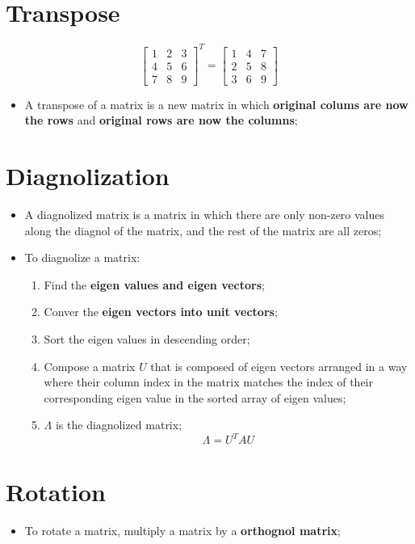 \section{Transpose}

  \begin{equation}
    \begin{bmatrix}
      1 & 2 & 3 \\
      4 & 5 & 6 \\
      7 & 8 & 9
    \end{bmatrix}^{T}
    = 
    \begin{bmatrix}
      1 & 4 & 7 \\
      2 & 5 & 8 \\
      3 & 6 & 9
    \end{bmatrix}
  \end{equation}

  \begin{itemize}
    \item A transpose of a matrix is a new matrix in which \textbf{original colums are now the rows} and \textbf{original rows are now the columns};
  \end{itemize}
  
\section{Diagnolization}

  \begin{itemize}
    \item A diagnolized matrix is a matrix in which there are only non-zero values along the diagnol of the matrix, and the rest of the matrix are all zeros;
    \item To diagnolize a matrix:
    \begin{enumerate}
      \item Find the \textbf{eigen values and eigen vectors};
      \item Conver the \textbf{eigen vectors into unit vectors};
      \item Sort the eigen values in descending order;
      \item Compose a matrix $ U $ that is composed of eigen vectors arranged in a way where their column index in the matrix matches the index of their corresponding eigen value in the sorted array of eigen values;
      \item $ \Lambda $ is the diagnolized matrix;
      \begin{equation}
        \Lambda = U^{T} A U
      \end{equation}
    \end{enumerate}
  \end{itemize}
  
\section{Rotation}

  \begin{itemize}
    \item To rotate a matrix, multiply a matrix by a \textbf{orthognol matrix};
  \end{itemize}
